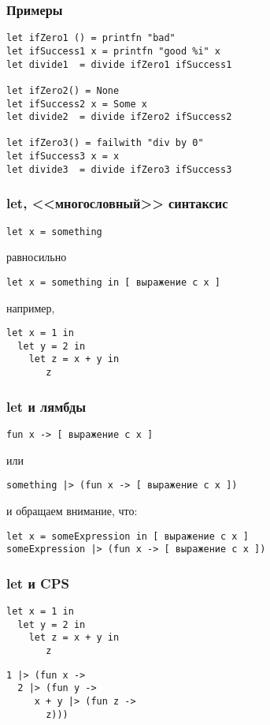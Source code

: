 \documentclass[xetex,mathserif,serif]{beamer}
\begin{document}
    \begin{frame}[fragile]
        \frametitle{Примеры}
        \begin{verbatim}
let ifZero1 () = printfn "bad"
let ifSuccess1 x = printfn "good %i" x
let divide1  = divide ifZero1 ifSuccess1

let ifZero2() = None
let ifSuccess2 x = Some x
let divide2  = divide ifZero2 ifSuccess2

let ifZero3() = failwith "div by 0"
let ifSuccess3 x = x
let divide3  = divide ifZero3 ifSuccess3
        \end{verbatim}
    \end{frame}

    \begin{frame}[fragile]
        \frametitle{let, <<многословный>> синтаксис}
        \begin{verbatim}
let x = something
        \end{verbatim}
        равносильно
        \begin{verbatim}
let x = something in [ выражение c x ]
        \end{verbatim}
        например,
        \begin{verbatim}
let x = 1 in
  let y = 2 in
    let z = x + y in
       z
        \end{verbatim}
    \end{frame}

    \begin{frame}[fragile]
        \frametitle{let и лямбды}
        \begin{verbatim}
fun x -> [ выражение c x ]
        \end{verbatim}
        или
        \begin{verbatim}
something |> (fun x -> [ выражение c x ])
        \end{verbatim}
        и обращаем внимание, что:
        \begin{verbatim}
let x = someExpression in [ выражение c x ]
someExpression |> (fun x -> [ выражение c x ])
        \end{verbatim}
    \end{frame}

    \begin{frame}[fragile]
        \frametitle{let и CPS}
        \begin{verbatim}
let x = 1 in
  let y = 2 in
    let z = x + y in
       z
        \end{verbatim}
        \begin{verbatim}
1 |> (fun x ->
  2 |> (fun y -> 
     x + y |> (fun z -> 
       z)))
        \end{verbatim}
    \end{frame}
\end{document}
